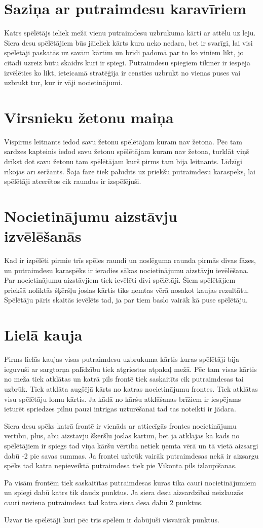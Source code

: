 \documentclass[11pt,a4paper,titlepage]{article}
\begin{document}
\section*{Saziņa ar putraimdesu karavīriem}
Katrs spēlētājs ieliek mežā vienu putraimdesu uzbrukuma kārti ar attēlu uz leju. Siera desu spēlētājiem būs  
jāieliek kārts kura neko nedara, bet ir svarīgi, lai visi spēlētāji paskatās uz savām kārtīm un brīdi padomā par to
ko viņiem likt, jo citādi uzreiz būtu skaidrs kuri ir spiegi. Putraimdesu spiegiem tikmēr ir iespēja izvēlēties ko likt, 
ieteicamā stratēģija ir censties uzbrukt no vienas puses vai uzbrukt tur, kur ir vāji nocietinājumi.

\section*{Virsnieku žetonu maiņa}
Vispirms leitnants iedod savu žetonu spēlētājam kuram nav žetona. Pēc tam sardzes kapteinis iedod savu žetonu spēlētājam
kuram nav žetona, turklāt viņš drīkst dot savu žetonu tam spēlētājam kurš pirms tam bija leitnants. Līdzīgi rīkojas
arī seržants. Šajā fāzē tiek pabīdīts uz priekšu putraimdesu karaspēks, lai spēlētāji atcerētos cik raundus ir 
izspēlējuši.

\section*{Nocietinājumu aizstāvju izvēlēšanās}
Kad ir izpēlēti pirmie trīs spēles raundi un noslēguma raunda pirmās divas fāzes, un putraimdesu karaspēks ir ieradies
sākas nocietinājumu aizstāvju ievēlēšana. Par nocietinājumu aizstāvjiem tiek ievēlēti divi spēlētāji. Šiem spēlētājiem
priekšā noliktās šķēršļu joslas kārtis tiks ņemtas vērā nosakot kaujas rezultātu. Spēlētāju pāris skaitās ievēlēts
tad, ja par tiem baslo vairāk kā puse spēlētāju. 
\section*{Lielā kauja}
Pirms lielās kaujas  visas putraimdesu uzbrukuma kārtis kuras spēlētāji bija ieguvuši ar sargtorņa
palīdzību tiek atgriestas atpakaļ mežā. Pēc tam visas kārtis no meža tiek atklātas un katrā pils frontē tiek saskaitīts
cik putraimdesas tai uzbrūk. Tiek atklāta augšējā kārts no katras nocietinājumu frontes. Tiek atklātas visu spēlētāju
lomu kārtis. Ja kādā no kāršu atklāšanas brīžiem ir iespējams ieturēt spriedzes pilnu pauzi intrigas uzturēšanai tad
tas noteikti ir jādara.

Siera desu spēks katrā frontē ir vienāds ar attiecīgās frontes 
nocietinājumu vērtību, plus, abu aizstāvju šķēršļu joslas kārtīm, bet ja atklājas ka kāds no spēlētājiem ir spiegs
tad viņa kāršu vērtība netiek ņemta vērā un tā vietā aizsargi dabū -2 pie savas summas. Ja frontei uzbrūk vairāk 
putraimdesas nekā ir aizsargu spēks tad katra nepieveiktā putraimdesa tiek pie Vikonta pils izlaupīšanas.

Pa visām frontēm tiek saskaitītas putraimdesas kuras tika cauri nocietinājumiem un spiegi dabū katrs tik daudz punktus.
Ja siera desu aizsardzībai neizlauzās cauri neviena putraimdesa tad katra siera desa dabū 2 punktus.

Uzvar tie spēlētāji kuri pēc trīs spēlēm ir dabūjuši visvairāk punktus.
\end{document}
